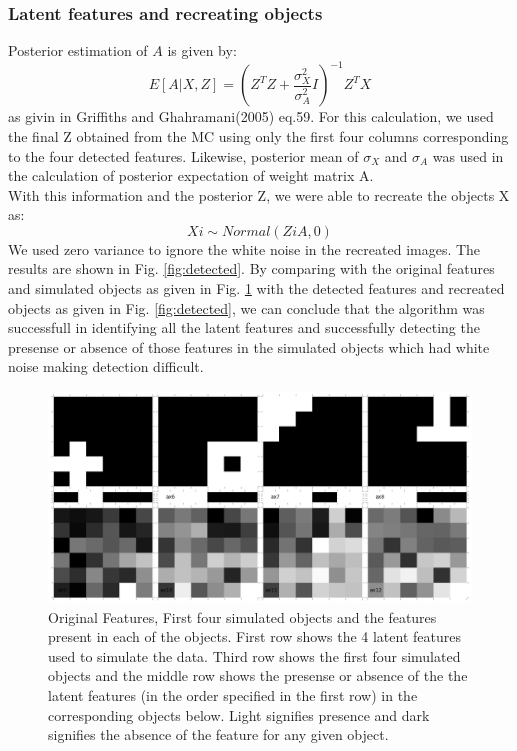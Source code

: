 \documentclass{article}
\begin{document}
\subsubsection{Latent features and recreating objects}
Posterior estimation of $A$ is given by:
\[
E[A|X,Z] = (Z^TZ+\frac{\sigma_X^2}{\sigma_A^2}I)^{-1}Z^TX
\]
as givin in Griffiths and Ghahramani(2005) eq.59. For this calculation, we used the final Z obtained from the MC using only the first four columns corresponding to the four detected features. Likewise, posterior mean of $\sigma_X$ and $\sigma_A$ was used in the calculation of posterior expectation of weight matrix A.\\
With this information and the posterior Z, we were able to recreate the objects X as:
\[
Xi \sim Normal(ZiA,0)
\]
We used zero variance to ignore the white noise in the recreated images. The results are shown in Fig. \ref{fig:detected}. By comparing with the original features and simulated objects as given in Fig. \ref{fig:original} with the detected features and recreated objects as given in Fig. \ref{fig:detected}, we can conclude that the algorithm was successfull in identifying all the latent features and successfully detecting the presense or absence of those features in the simulated objects which had white noise making detection difficult.


\begin{figure}
\includegraphics[width=\linewidth]{figures/Original.png}
\caption {Original Features, First four simulated objects and the features present in each of the objects. First row shows the 4 latent features used to simulate the data. Third row shows the first four simulated objects and the middle row shows the presense or absence of the the latent features (in the order specified in the first row) in the corresponding objects below. Light signifies presence and dark signifies the absence of the feature for any given object.}
\label{fig:original}
\end{figure}
\end{document}
